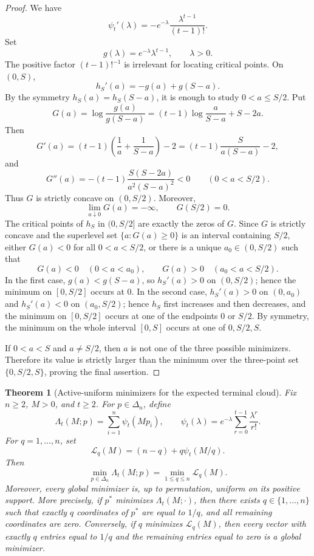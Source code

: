 \documentclass[11pt]{article}
\newtheorem{theorem}{Theorem}
\theoremstyle{definition}
\theoremstyle{remark}
\newcommand{\1}{\mathbf 1}
\begin{document}
\begin{proof}
We have
\[
  \psi_t'(\lambda)=-e^{-\lambda}\frac{\lambda^{t-1}}{(t-1)!}.
\]
Set
\[
  g(\lambda)=e^{-\lambda}\lambda^{t-1},\qquad \lambda>0.
\]
The positive factor \((t-1)!^{-1}\) is irrelevant for locating critical points.  On \((0,S)\),
\[
  h_S'(a)=-g(a)+g(S-a).
\]
By the symmetry \(h_S(a)=h_S(S-a)\), it is enough to study \(0<a\le S/2\).  Put
\[
  G(a)=\log\frac{g(a)}{g(S-a)}
  =(t-1)\log\frac{a}{S-a}+S-2a.
\]
Then
\[
  G'(a)=(t-1)\left(\frac1a+\frac1{S-a}\right)-2
        =(t-1)\frac{S}{a(S-a)}-2,
\]
and
\[
  G''(a)=-(t-1)\frac{S(S-2a)}{a^2(S-a)^2}<0
  \qquad(0<a<S/2).
\]
Thus \(G\) is strictly concave on \((0,S/2)\).  Moreover,
\[
  \lim_{a\downarrow0}G(a)=-\infty,
  \qquad
  G(S/2)=0.
\]
The critical points of \(h_S\) in \((0,S/2]\) are exactly the zeros of \(G\).  Since \(G\) is strictly concave and the superlevel set \(\{a:G(a)\ge0\}\) is an interval containing \(S/2\), either \(G(a)<0\) for all \(0<a<S/2\), or there is a unique \(a_0\in(0,S/2)\) such that
\[
  G(a)<0\quad(0<a<a_0),
  \qquad
  G(a)>0\quad(a_0<a<S/2).
\]
In the first case, \(g(a)<g(S-a)\), so \(h_S'(a)>0\) on \((0,S/2)\); hence the minimum on \([0,S/2]\) occurs at \(0\).  In the second case, \(h_S'(a)>0\) on \((0,a_0)\) and \(h_S'(a)<0\) on \((a_0,S/2)\); hence \(h_S\) first increases and then decreases, and the minimum on \([0,S/2]\) occurs at one of the endpoints \(0\) or \(S/2\).  By symmetry, the minimum on the whole interval \([0,S]\) occurs at one of \(0,S/2,S\).

If \(0<a<S\) and \(a\ne S/2\), then \(a\) is not one of the three possible minimizers.  Therefore its value is strictly larger than the minimum over the three-point set \(\{0,S/2,S\}\), proving the final assertion.
\end{proof}

\begin{theorem}[Active-uniform minimizers for the expected terminal cloud]\label{thm:active-uniform-terminal-cloud}
Fix \(n\ge2\), \(M>0\), and \(t\ge2\).  For \(p\in\Delta_n\), define
\[
  \Lambda_t(M;p)=\sum_{i=1}^n \psi_t(Mp_i),
  \qquad
  \psi_t(\lambda)=e^{-\lambda}\sum_{r=0}^{t-1}\frac{\lambda^r}{r!}.
\]
For \(q=1,\ldots,n\), set
\[
  \mathcal L_q(M)=(n-q)+q\psi_t(M/q).
\]
Then
\[
  \boxed{\min_{p\in\Delta_n}\Lambda_t(M;p)=\min_{1\le q\le n}\mathcal L_q(M).}
\]
Moreover, every global minimizer is, up to permutation, uniform on its positive support.  More precisely, if \(p^*\) minimizes \(\Lambda_t(M;\cdot)\), then there exists \(q\in\{1,\ldots,n\}\) such that exactly \(q\) coordinates of \(p^*\) are equal to \(1/q\), and all remaining coordinates are zero.  Conversely, if \(q\) minimizes \(\mathcal L_q(M)\), then every vector with exactly \(q\) entries equal to \(1/q\) and the remaining entries equal to zero is a global minimizer.
\end{theorem}
\end{document}
